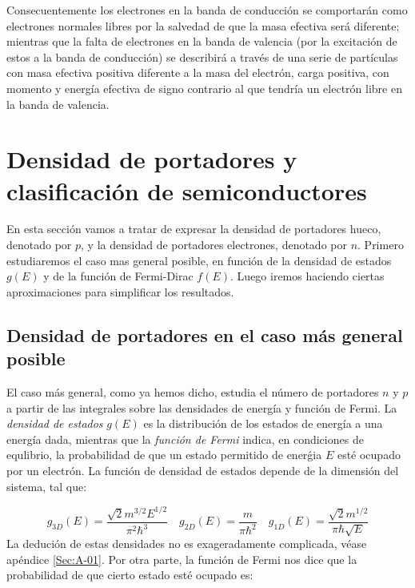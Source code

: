 Consecuentemente los electrones en la banda de conducción se comportarán como electrones normales libres por la salvedad de que la masa efectiva será diferente; mientras que la falta de electrones en la banda de valencia (por la excitación de estos a la banda de conducción) se describirá a través de una serie de partículas con masa efectiva positiva diferente a la masa del electrón, carga positiva, con momento y energía efectiva de signo contrario al que tendría un electrón libre en la banda de valencia.



\section{Densidad de portadores y clasificación de semiconductores}

En esta sección vamos a tratar de expresar la densidad de portadores hueco, denotado por $p$, y la densidad de portadores electrones, denotado por $n$. Primero estudiaremos el caso mas general posible, en función de la densidad de estados $g(E)$ y de la función de Fermi-Dirac $f(E)$. Luego iremos haciendo ciertas aproximaciones para simplificar los resultados.

\subsection{Densidad de portadores en el caso más general posible}

El caso más general, como ya hemos dicho, estudia el número de portadores $n$ y $p$ a partir de las integrales sobre las densidades de energía y función de Fermi. La \textit{densidad de estados} $g(E)$ es la distribución de los estados de energía a una energía dada, mientras que la \textit{función de Fermi} indica, en condiciones de equlibrio, la probabilidad de que un estado permitido de enerǵia $E$ esté ocupado por un electrón. La función de densidad de estados depende de la dimensión del sistema, tal que:

\begin{equation}
	g_{3D} (E) = \frac{\sqrt{2}m^{3/2}E^{1/2}}{\pi^2 \hbar^3} \quad g_{2D} (E) = \frac{m}{\pi \hbar^2} \quad g_{1D} (E) = \frac{\sqrt{2}m^{1/2}}{\pi \hbar \sqrt{E}}
\end{equation}
La dedución de estas densidades no es exageradamente complicada, véase apéndice \ref{Sec:A-01}. Por otra parte, la función de Fermi nos dice que la probabilidad de que cierto estado esté ocupado es:


